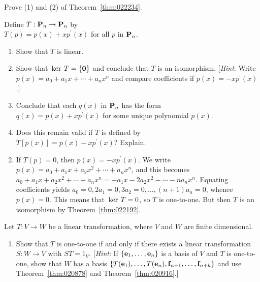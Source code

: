 \begin{multicols}{2}
\begin{ex}\label{ex:ex7_3_25}
Prove (1) and (2) of Theorem~\ref{thm:022234}.
\end{ex}

\begin{ex}
Define $T : \textbf{P}_{n} \to \textbf{P}_{n}$ by \\ $T(p) = p(x) + xp^\prime(x)$ for all $p$ in $\textbf{P}_{n}$.


\begin{enumerate}[label={\alph*.}]
\item Show that $T$ is linear.

\item Show that $\thinspace\operatorname{ker \medspace}T = \{\textbf{0}\}$ and conclude that $T$ is an isomorphism. [\textit{Hint}: Write $p(x) = a_{0} + a_{1}x + \cdots + a_{n}x^{n}$ and compare coefficients if $p(x) = -xp^\prime(x)$.]

\item Conclude that each $q(x)$ in $\textbf{P}_{n}$ has the form \\ $q(x) = p(x) + xp^\prime(x)$ for some unique polynomial $p(x)$.

\item Does this remain valid if $T$ is defined by \\ $T[p(x)] = p(x) - xp^\prime(x)$? Explain.

\end{enumerate}
\begin{sol}
\begin{enumerate}[label={\alph*.}]
\setcounter{enumi}{1}
\item  If $T(p) = 0$, then $p(x) = -xp^\prime(x)$. We write $p(x) = a_{0} + a_{1}x + a_{2}x^{2} + \cdots + a_{n}x^{n}$, and this becomes $a_{0} + a_{1}x + a_{2}x^{2} + \cdots + a_{n}x^{n} = -a_{1}x - 2a_{2}x^{2} - \cdots - na_{n}x^{n}$. Equating coefficients yields $a_{0} = 0, 2a_{1} = 0, 3a_{2} = 0, \dots, (n + 1)a_{n} = 0$, whence $p(x) = 0$. This means that $\thinspace\operatorname{ker \medspace}T = 0$, so $T$ is one-to-one. But then $T$ is an isomorphism by Theorem~\ref{thm:022192}.

\end{enumerate}
\end{sol}
\end{ex}

\begin{ex}
Let $T : V \to W$ be a linear transformation, where $V$ and $W$ are finite dimensional.


\begin{enumerate}[label={\alph*.}]
\item Show that $T$ is one-to-one if and only if there exists a linear transformation $S : W \to V$ with $ST = 1_{V}$. [\textit{Hint}: If $\{\textbf{e}_{1}, \dots, \textbf{e}_{n}\}$ is a basis of $V$ and $T$ is one-to-one, show that $W$ has a basis $\{T(\textbf{e}_{1}), \dots, T(\textbf{e}_{n}), \textbf{f}_{n+1}, \dots, \textbf{f}_{n+k}\}$ and use Theorem~\ref{thm:020878} and Theorem~\ref{thm:020916}.]


\end{enumerate}
\end{ex}
\end{multicols}

